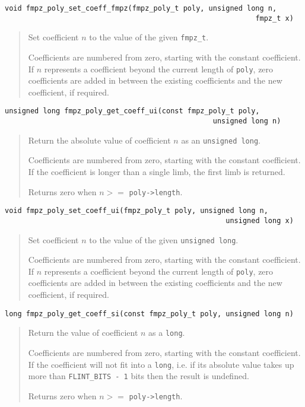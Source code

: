 \documentclass[a4paper,10pt]{article}
\newcommand{\code}{\lstinline}
\begin{document}
\begin{lstlisting}
void fmpz_poly_set_coeff_fmpz(fmpz_poly_t poly, unsigned long n, 
                                                           fmpz_t x) 
\end{lstlisting}
\begin{quote}
Set coefficient $n$ to the value of the given \code{fmpz_t}. 

Coefficients are numbered from zero, starting with the constant coefficient. If $n$ represents a coefficient beyond the current length of \code{poly}, zero coefficients are added in between the existing coefficients and the new coefficient, if required.
\end{quote}

\begin{lstlisting}
unsigned long fmpz_poly_get_coeff_ui(const fmpz_poly_t poly, 
                                                 unsigned long n)
\end{lstlisting}
\begin{quote}
Return the absolute value of coefficient $n$ as an \code{unsigned long}.

Coefficients are numbered from zero, starting with the constant coefficient. If the coefficient is longer than a single limb, the first limb is returned.

Returns zero when $n >= $ \code{poly->length}. 
\end{quote}

\begin{lstlisting}
void fmpz_poly_set_coeff_ui(fmpz_poly_t poly, unsigned long n, 
                                                    unsigned long x) 
\end{lstlisting}
\begin{quote}
Set coefficient $n$ to the value of the given \code{unsigned long}. 

Coefficients are numbered from zero, starting with the constant coefficient. If $n$ represents a coefficient beyond the current length of \code{poly}, zero coefficients are added in between the existing coefficients and the new coefficient, if required.
\end{quote}

\begin{lstlisting}
long fmpz_poly_get_coeff_si(const fmpz_poly_t poly, unsigned long n)
\end{lstlisting}
\begin{quote}
Return the value of coefficient $n$ as a \code{long}.

Coefficients are numbered from zero, starting with the constant coefficient. If the coefficient will not fit into a \code{long}, i.e. if its absolute value takes up more than \code{FLINT_BITS - 1} bits then the result is undefined.

Returns zero when $n >= $ \code{poly->length}. 
\end{quote}
\end{document}
